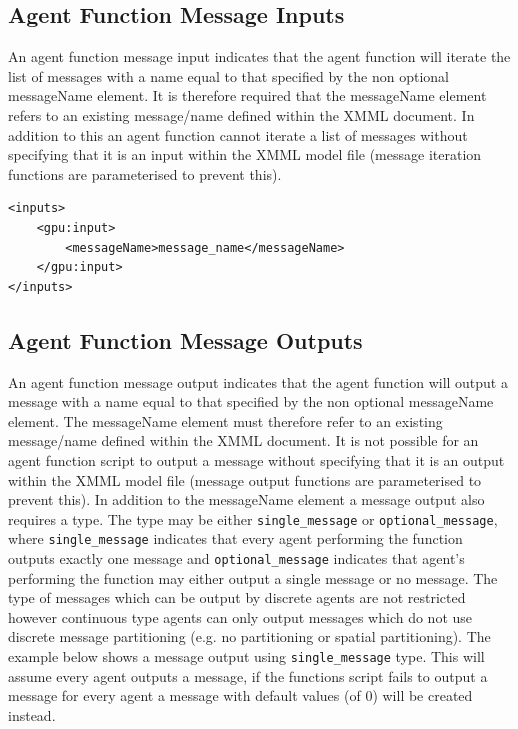 \documentclass[11pt, a4paper, onecolumn, oneside]{report}
\begin{document}
\subsection{Agent Function Message Inputs}
\label{sec:251}


An agent function message input indicates that the agent function will iterate the list of messages with a name equal to that specified by the non optional messageName element.
It is therefore required that the messageName element refers to an existing message/name defined within the XMML document.
In addition to this an agent function cannot iterate a list of messages without specifying that it is an input within the XMML model file (message iteration functions are parameterised to prevent this).

\begin{verbatim}
<inputs>
    <gpu:input>
        <messageName>message_name</messageName>
    </gpu:input>
</inputs>
\end{verbatim}

\subsection{Agent Function Message Outputs}
\label{sec:252}

An agent function message output indicates that the agent function will output a message with a name equal to that specified by the non optional messageName element.
The messageName element must therefore refer to an existing message/name defined within the XMML document.
It is not possible for an agent function script to output a message without specifying that it is an output within the XMML model file (message output functions are parameterised to prevent this).
In addition to the messageName element a message output also requires a type.
The type may be either \texttt{single_message} or \texttt{optional_message}, where \texttt{single_message} indicates that every agent performing the function outputs exactly one message and \texttt{optional_message} indicates that agent's performing the function may either output a single message or no message.
The type of messages which can be output by discrete agents are not restricted however continuous type agents can only output messages which do not use discrete message partitioning (e.g.
no partitioning or spatial partitioning).
The example below shows a message output using \texttt{single_message} type.
This will assume every agent outputs a message, if the functions script fails to output a message for every agent a message with default values (of $0$) will be created instead.
\end{document}
